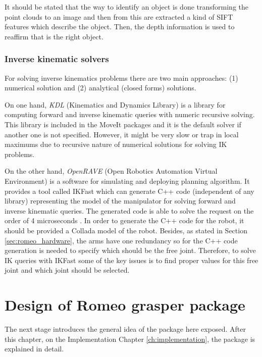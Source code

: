 \documentclass[12pt,a4paper,final,twoside,openright]{report}
\begin{document}
It should be stated that the way to identify an object is done transforming the point clouds to an image and then from this are extracted a kind of SIFT features which describe the object. Then, the depth information is used to reaffirm that is the right object.

\subsection{Inverse kinematic solvers}
\label{sec:inverse_kinematic}

For solving inverse kinematics problems there are two main approaches: (1) numerical solution and (2) analytical (closed forms) solutions. 

On one hand, \textit{KDL} (Kinematics and Dynamics Library)\cite{KDL} is a library for computing forward and inverse kinematic queries with numeric recursive solving. This library is included in the MoveIt packages and it is the default solver if another one is not specified. However, it might be very slow or trap in local maximums due to recursive nature of numerical solutions for solving IK problems. 

On the other hand, \textit{OpenRAVE} (Open Robotics Automation Virtual Environment)\cite{Diankov2010} is a software for simulating and deploying planning algorithm. It provides a tool called IKFast which can generate C++ code (independent of any library) representing the model of the manipulator for solving forward and inverse kinematic queries. The generated code is able  to solve the request on the order of 4 microseconds \cite{Diankov}. In order to generate the C++ code for the robot, it should be provided a Collada model \cite{KhronosGroup} of the robot. Besides, as stated in Section \ref{sec:romeo_hardware}, the arms have one redundancy so for the C++ code generation is needed to specify which should be the free joint. Therefore, to solve IK queries with IKFast some of the key issues is to find proper values for this free joint and which joint should be selected. 


\chapter{Design of Romeo grasper package}
\label{cha:design}

The next stage introduces the general idea of the package here exposed. After this chapter, on the Implementation Chapter \ref{ch:implementation}, the package is explained in detail. 
\end{document}
